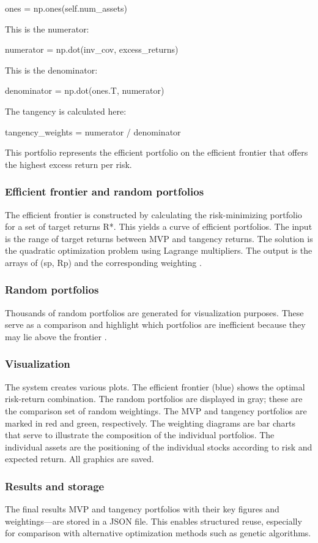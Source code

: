 \documentclass{agasthesis}
\begin{document}
ones = np.ones(self.num_assets)

This is the numerator:

numerator = np.dot(inv_cov, excess_returns)

This is the denominator:

denominator = np.dot(ones.T, numerator)

The tangency is calculated here:

tangency_weights = numerator / denominator

This portfolio represents the efficient portfolio on the efficient frontier that offers the highest excess return per risk.

\subsubsection{Efficient frontier and random portfolios}
The efficient frontier is constructed by calculating the risk-minimizing portfolio for a set of target returns R*. 
This yields a curve of efficient portfolios. The input is the range of target returns between MVP and tangency returns. 
The solution is the quadratic optimization problem using Lagrange multipliers. 
The output is the arrays of (sp, Rp) and the corresponding weighting \cite[p. 1851-1872]{merton_analytic_1972}.
\subsubsection{Random portfolios}
Thousands of random portfolios are generated for visualization purposes. These serve as a comparison and highlight which 
portfolios are inefficient because they may lie above the frontier \cite[p. 225-310]{elton_modern_2009}.
\subsubsection{Visualization}
The system creates various plots. The efficient frontier (blue) shows the optimal risk-return combination. The random portfolios are displayed 
in gray; these are the comparison set of random weightings. The MVP and tangency portfolios are marked in red and green, respectively. 
The weighting diagrams are bar charts that serve to illustrate the composition of the individual portfolios. The individual assets are 
the positioning of the individual stocks according to risk and expected return. All graphics are saved.
\subsubsection{Results and storage}
The final results MVP and tangency portfolios with their key figures and weightings—are stored in a JSON file. This enables structured reuse, 
especially for comparison with alternative optimization methods such as genetic algorithms.
\end{document}
